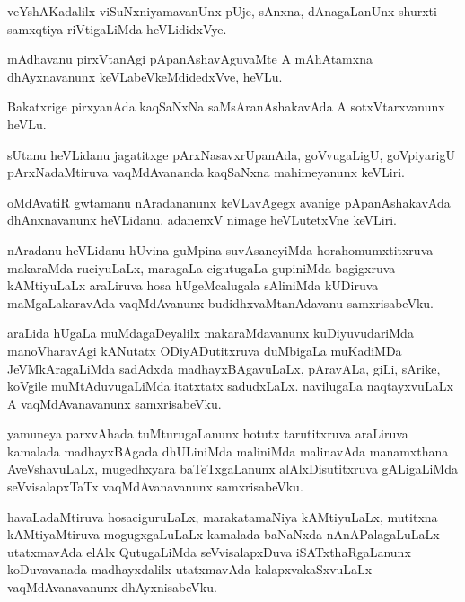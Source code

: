 \documentclass{article}
\begin{document}
\begin{mn}%
veYshAKadalilx viSuNxniyamavanUnx pUje, sAnxna, dAnagaLanUnx shurxti samxqtiya 
riVtigaLiMda heVLididxVye.
\end{mn}

\begin{mn}%
mAdhavanu pirxVtanAgi pApanAshavAguvaMte A mAhAtamxna dhAyxnavanunx keVLabeVkeMdidedxVve, 
heVLu.
\end{mn}

\begin{mn}%
Bakatxrige pirxyanAda kaqSaNxNa saMsAranAshakavAda A sotxVtarxvanunx heVLu.
\end{mn}

\begin{mn}%
sUtanu heVLidanu jagatitxge pArxNasavxrUpanAda, goVvugaLigU, goVpiyarigU pArxNadaMtiruva 
vaqMdAvananda kaqSaNxna mahimeyanunx keVLiri.
\end{mn}

\begin{mn}%
oMdAvatiR gwtamanu nAradananunx keVLavAgegx avanige pApanAshakavAda dhAnxnavanunx 
heVLidanu. adanenxV nimage heVLutetxVne keVLiri.
\end{mn}

\begin{mn}%
nAradanu heVLidanu-hUvina guMpina suvAsaneyiMda horahomumxtitxruva makaraMda ruciyuLaLx, 
maragaLa cigutugaLa gupiniMda bagigxruva kAMtiyuLaLx araLiruva hosa hUgeMcalugala 
sAliniMda kUDiruva maMgaLakaravAda vaqMdAvanunx  budidhxvaMtanAdavanu samxrisabeVku.
\end{mn}

\begin{mn}%
araLida hUgaLa muMdagaDeyalilx makaraMdavanunx kuDiyuvudariMda manoVharavAgi kANutatx 
ODiyADutitxruva duMbigaLa  muKadiMDa JeVMkAragaLiMda sadAdxda madhayxBAgavuLaLx, pAravALa, 
giLi, sArike, koVgile muMtAduvugaLiMda  itatxtatx sadudxLaLx. navilugaLa naqtayxvuLaLx A 
vaqMdAvanavanunx samxrisabeVku.
\end{mn}

\begin{mn}%
yamuneya parxvAhada tuMturugaLanunx hotutx tarutitxruva araLiruva kamalada madhayxBAgada 
dhULiniMda maliniMda malinavAda manamxthana AveVshavuLaLx, mugedhxyara baTeTxgaLanunx 
alAlxDisutitxruva gALigaLiMda seVvisalapxTaTx vaqMdAvanavanunx samxrisabeVku.
\end{mn}

\begin{mn}%
havaLadaMtiruva hosaciguruLaLx, marakatamaNiya kAMtiyuLaLx, mutitxna kAMtiyaMtiruva 
mogugxgaLuLaLx kamalada baNaNxda nAnAPalagaLuLaLx utatxmavAda elAlx QutugaLiMda 
seVvisalapxDuva iSATxthaRgaLanunx koDuvavanada madhayxdalilx utatxmavAda kalapxvakaSxvuLaLx
vaqMdAvanavanunx dhAyxnisabeVku.
\end{mn}
\end{document}
